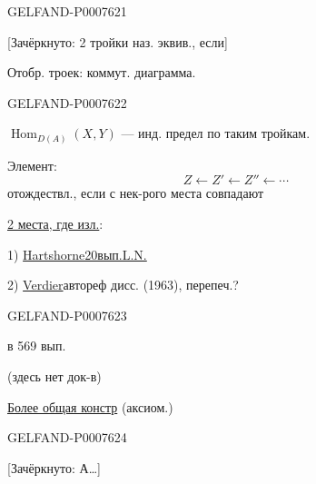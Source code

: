 \begin{GelfandAdjacentEvidence}{GELFAND-P000762}{1}

[Зачёркнуто: 2 тройки наз. эквив., если]

Отобр. троек: коммут. диаграмма.
\end{GelfandAdjacentEvidence}
\begin{GelfandAdjacentEvidence}{GELFAND-P000762}{2}


\(\operatorname{Hom}_{D(A)}(X,Y)\) --- инд. предел по таким тройкам.

Элемент:
\[
Z\longleftarrow Z'\longleftarrow Z''\longleftarrow\cdots
\]
отождествл., если с нек-рого места совпадают

\underline{2 места, где изл.}:

1) \underline{Hartshorne}\qquad\underline{20}\quad\underline{вып.}\quad\underline{L.N.}


2) \underline{Verdier}\quad автореф дисс. (1963), перепеч.?
\end{GelfandAdjacentEvidence}
\begin{GelfandAdjacentEvidence}{GELFAND-P000762}{3}

в 569 вып. 

(здесь нет док-в)

\underline{Более общая констр} (аксиом.)
\end{GelfandAdjacentEvidence}
\begin{GelfandAdjacentEvidence}{GELFAND-P000762}{4}


[Зачёркнуто: А…]
\end{GelfandAdjacentEvidence}
